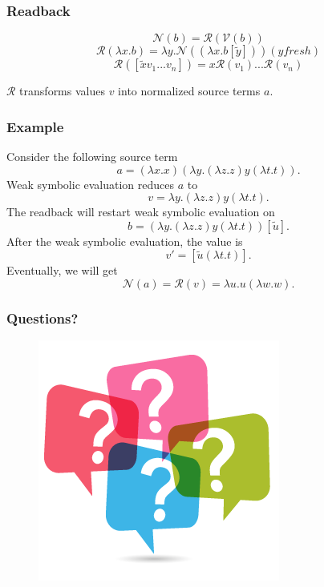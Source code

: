 \documentclass{beamer}
\begin{document}
\begin{frame}
\frametitle{Readback}
\begin{equation}
\mathcal{N}(b) = \mathcal{R}(\mathcal{V}(b))
\end{equation}
\begin{equation}
\mathcal{R}(\lambda x.b) = \lambda y.\mathcal{N}((\lambda x.b [\tilde{y}])) (y fresh)
\end{equation}
\begin{equation}
\mathcal{R}([\tilde{x} v_1 ... v_n]) = x \mathcal{R}(v_1) ... \mathcal{R}(v_n)
\end{equation}

$\mathcal{R}$ transforms values $v$ into normalized source terms $a$.
\end{frame}

\begin{frame}
\frametitle{Example}
Consider the following source term
\begin{equation*}
a = (\lambda x.x)(\lambda y.(\lambda z.z) y (\lambda t.t)).
\end{equation*}
Weak symbolic evaluation reduces $a$ to 
\begin{equation*}
v = \lambda y.(\lambda z.z) y (\lambda t.t).
\end{equation*}
The readback will restart weak symbolic evaluation on 
\begin{equation*}
b = (\lambda y.(\lambda z.z) y (\lambda t.t)) [\tilde{u}].
\end{equation*}
After the weak symbolic evaluation, the value is 
\begin{equation*}
v' = [\tilde{u} (\lambda t.t)].
\end{equation*}
Eventually, we will get
\begin{equation*}
\mathcal{N}(a) = \mathcal{R}(v) = \lambda u.u (\lambda w.w).
\end{equation*}


\end{frame}



\begin{frame}
\frametitle{Questions?}
\begin{figure}
\includegraphics[width=0.6\linewidth]{questionmark}
\end{figure}
\end{frame}
\end{document}
